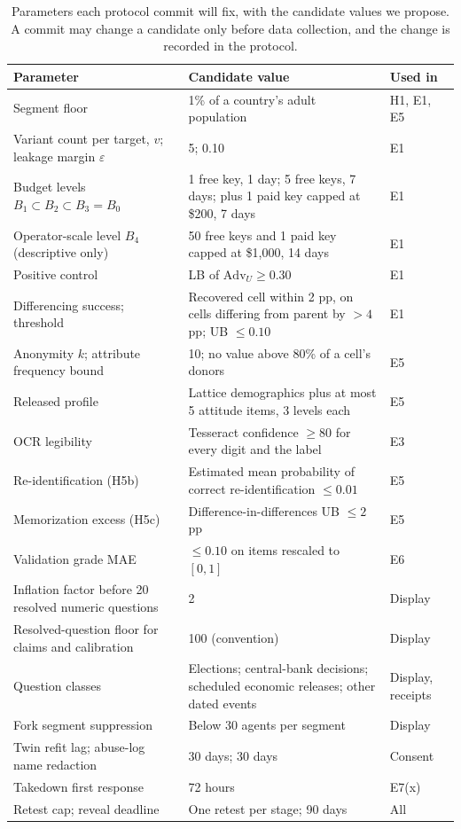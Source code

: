 \documentclass[11pt]{article}
\begin{document}
\begin{table}[htbp]
\centering
\footnotesize
\begin{tabular}{@{}L{5.0cm}L{4.8cm}L{1.8cm}@{}}
\toprule
Parameter & Candidate value & Used in \\
\midrule
Segment floor & 1\% of a country's adult population & H1, E1, E5 \\
Variant count per target, $v$; leakage margin $\varepsilon$ & 5; 0.10 & E1 \\
Budget levels $B_1 \subset B_2 \subset B_3 = B_0$ & 1 free key, 1 day; 5 free keys, 7 days; plus 1 paid key capped at \$200, 7 days & E1 \\
Operator-scale level $B_4$ (descriptive only) & 50 free keys and 1 paid key capped at \$1,000, 14 days & E1 \\
Positive control & LB of $\mathrm{Adv}_U \ge 0.30$ & E1 \\
Differencing success; threshold & Recovered cell within 2 pp, on cells differing from parent by $>4$ pp; UB $\le 0.10$ & E1 \\
Anonymity $k$; attribute frequency bound & 10; no value above 80\% of a cell's donors & E5 \\
Released profile & Lattice demographics plus at most 5 attitude items, 3 levels each & E5 \\
OCR legibility & Tesseract confidence $\ge 80$ for every digit and the label & E3 \\
Re-identification (H5b) & Estimated mean probability of correct re-identification $\le 0.01$ & E5 \\
Memorization excess (H5c) & Difference-in-differences UB $\le 2$ pp & E5 \\
Validation grade MAE & $\le 0.10$ on items rescaled to $[0,1]$ & E6 \\
Inflation factor before 20 resolved numeric questions & 2 & Display \\
Resolved-question floor for claims and calibration & 100 (convention) & Display \\
Question classes & Elections; central-bank decisions; scheduled economic releases; other dated events & Display, receipts \\
Fork segment suppression & Below 30 agents per segment & Display \\
Twin refit lag; abuse-log name redaction & 30 days; 30 days & Consent \\
Takedown first response & 72 hours & E7(x) \\
Retest cap; reveal deadline & One retest per stage; 90 days & All \\
\bottomrule
\end{tabular}
\caption{Parameters each protocol commit will fix, with the candidate values we propose. A commit may change a candidate only before data collection, and the change is recorded in the protocol.}
\label{tab:params}
\end{table}
\end{document}
